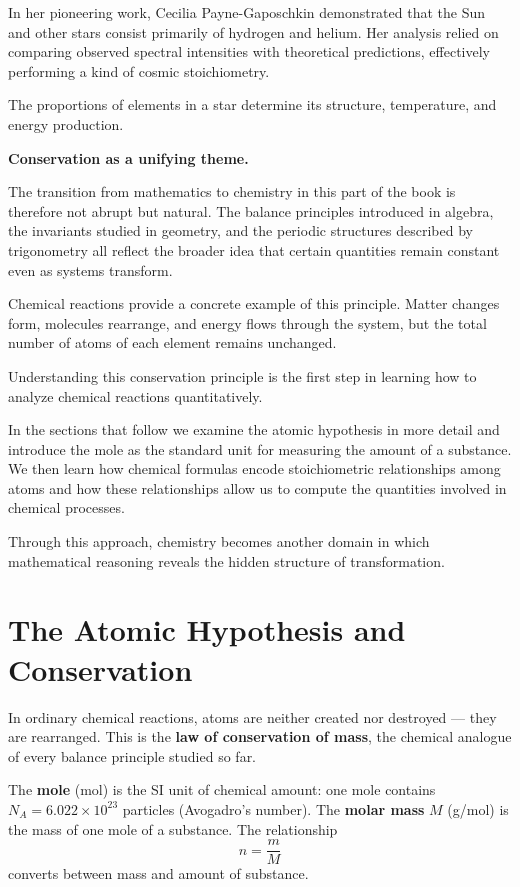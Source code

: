 \documentclass[11pt, openany]{book}
\theoremstyle{plain}
\theoremstyle{definition}
\theoremstyle{remark}
\begin{document}
In her pioneering work, Cecilia Payne-Gaposchkin demonstrated that the
Sun and other stars consist primarily of hydrogen and helium. Her
analysis relied on comparing observed spectral intensities with
theoretical predictions, effectively performing a kind of cosmic
stoichiometry.

The proportions of elements in a star determine its structure,
temperature, and energy production.

\medskip

\textbf{Conservation as a unifying theme.}

The transition from mathematics to chemistry in this part of the book is
therefore not abrupt but natural. The balance principles introduced in
algebra, the invariants studied in geometry, and the periodic structures
described by trigonometry all reflect the broader idea that certain
quantities remain constant even as systems transform.

Chemical reactions provide a concrete example of this principle. Matter
changes form, molecules rearrange, and energy flows through the system,
but the total number of atoms of each element remains unchanged.

Understanding this conservation principle is the first step in learning
how to analyze chemical reactions quantitatively.

\medskip

In the sections that follow we examine the atomic hypothesis in more
detail and introduce the mole as the standard unit for measuring the
amount of a substance. We then learn how chemical formulas encode
stoichiometric relationships among atoms and how these relationships
allow us to compute the quantities involved in chemical processes.

Through this approach, chemistry becomes another domain in which
mathematical reasoning reveals the hidden structure of transformation.

\section{The Atomic Hypothesis and Conservation}

In ordinary chemical reactions, atoms are neither created nor destroyed ---
they are rearranged. This is the \textbf{law of conservation of mass}, the
chemical analogue of every balance principle studied so far.

\begin{mydefinition}
The \textbf{mole} (mol) is the SI unit of chemical amount: one mole contains
$N_A=6.022\times10^{23}$ particles (Avogadro's number). The
\textbf{molar mass} $M$ (g/mol) is the mass of one mole of a substance.
The relationship
\[
  n = \frac{m}{M}
\]
converts between mass and amount of substance.
\end{mydefinition}
\end{document}
